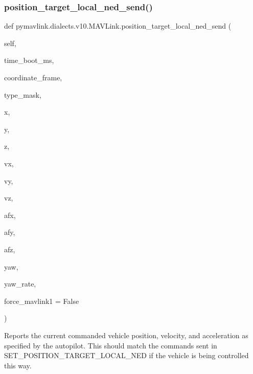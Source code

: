 \begin{DoxyVerb}
\begin{DoxyVerb}
\begin{DoxyVerb}
\begin{DoxyVerb}
\subsubsection{\texorpdfstring{position\+\_\+target\+\_\+local\+\_\+ned\+\_\+send()}{position\_target\_local\_ned\_send()}}
{\footnotesize\ttfamily def pymavlink.\+dialects.\+v10.\+M\+A\+V\+Link.\+position\+\_\+target\+\_\+local\+\_\+ned\+\_\+send (\begin{DoxyParamCaption}\item[{}]{self,  }\item[{}]{time\+\_\+boot\+\_\+ms,  }\item[{}]{coordinate\+\_\+frame,  }\item[{}]{type\+\_\+mask,  }\item[{}]{x,  }\item[{}]{y,  }\item[{}]{z,  }\item[{}]{vx,  }\item[{}]{vy,  }\item[{}]{vz,  }\item[{}]{afx,  }\item[{}]{afy,  }\item[{}]{afz,  }\item[{}]{yaw,  }\item[{}]{yaw\+\_\+rate,  }\item[{}]{force\+\_\+mavlink1 = {\ttfamily False} }\end{DoxyParamCaption})}

\begin{DoxyVerb}Reports the current commanded vehicle position, velocity, and
acceleration as specified by the autopilot. This
should match the commands sent in
SET_POSITION_TARGET_LOCAL_NED if the vehicle is being
controlled this way.


\end{DoxyVerb}
\end{DoxyVerb}
\end{DoxyVerb}
\end{DoxyVerb}
\end{DoxyVerb}
